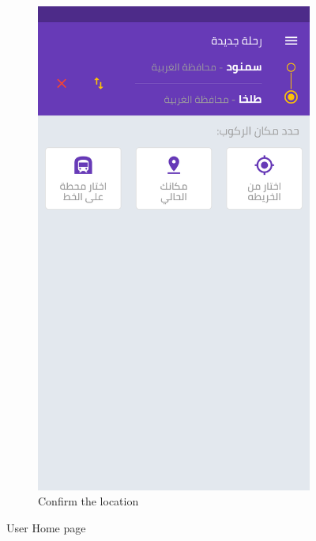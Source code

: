 \begin{figure}[H]
\begin{subfigure}[b]{0.5\linewidth}
    \includegraphics[width=0.75\linewidth]{images/ch3/1.png}
    \caption{Confirm the location} 
    \label{fig7:b} 
    \vspace{4ex}
  \end{subfigure} 
  \caption{ User Home page}
  \label{fig7} 
\end{figure}

